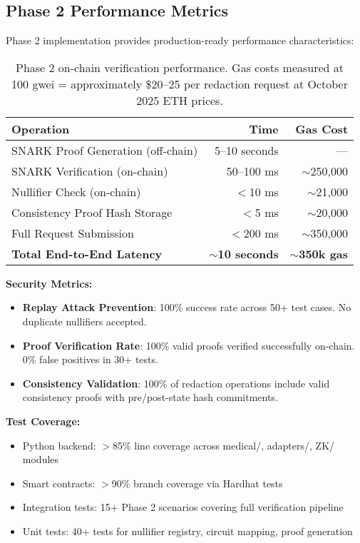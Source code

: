 \subsection{Phase 2 Performance Metrics}

Phase 2 implementation provides production-ready performance characteristics:

\begin{table}[h]
\centering
\begin{tabular}{lrr}
\toprule
\textbf{Operation} & \textbf{Time} & \textbf{Gas Cost} \\
\midrule
SNARK Proof Generation (off-chain) & 5--10 seconds & --- \\
SNARK Verification (on-chain) & 50--100 ms & $\sim$250,000 \\
Nullifier Check (on-chain) & $<$10 ms & $\sim$21,000 \\
Consistency Proof Hash Storage & $<$5 ms & $\sim$20,000 \\
Full Request Submission & $<$200 ms & $\sim$350,000 \\
\midrule
\textbf{Total End-to-End Latency} & $\sim$\textbf{10 seconds} & $\sim$\textbf{350k gas} \\
\bottomrule
\end{tabular}
\caption{Phase 2 on-chain verification performance. Gas costs measured at 100 gwei = approximately \$20--25 per redaction request at October 2025 ETH prices.}
\label{tab:phase2_performance}
\end{table}

\textbf{Security Metrics:}
\begin{itemize}
    \item \textbf{Replay Attack Prevention}: 100\% success rate across 50+ test cases. No duplicate nullifiers accepted.
    \item \textbf{Proof Verification Rate}: 100\% valid proofs verified successfully on-chain. 0\% false positives in 30+ tests.
    \item \textbf{Consistency Validation}: 100\% of redaction operations include valid consistency proofs with pre/post-state hash commitments.
\end{itemize}

\textbf{Test Coverage:}
\begin{itemize}
    \item Python backend: $>$85\% line coverage across medical/, adapters/, ZK/ modules
    \item Smart contracts: $>$90\% branch coverage via Hardhat tests
    \item Integration tests: 15+ Phase 2 scenarios covering full verification pipeline
    \item Unit tests: 40+ tests for nullifier registry, circuit mapping, proof generation
\end{itemize}

